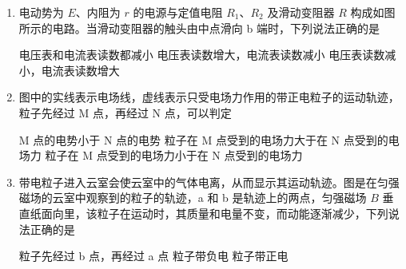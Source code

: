 \documentclass[\gkver]{gaokaozhenti}
\begin{document}
\begin{enumerate}
\item
电动势为 $E$、内阻为 $r$ 的电源与定值电阻 $R_{1}$、$R_{2}$ 及滑动变阻器 $R$ 构成如图所示的电路。当滑动变阻器的触头由中点滑向 b 端时，下列说法正确的是


{电压表和电流表读数都减小}
{电压表读数增大，电流表读数减小}
{电压表读数减小，电流表读数增大}


\item
图中的实线表示电场线，虚线表示只受电场力作用的带正电粒子的运动轨迹，粒子先经过 M 点，再经过 N 点，可以判定


{M 点的电势小于 N 点的电势}
{粒子在 M 点受到的电场力大于在 N 点受到的电场力}
{粒子在 M 点受到的电场力小于在 N 点受到的电场力}


\item
带电粒子进入云室会使云室中的气体电离，从而显示其运动轨迹。图是在匀强磁场的云室中观察到的粒子的轨迹，a 和 b 是轨迹上的两点，匀强磁场 $B$ 垂直纸面向里，该粒子在运动时，其质量和电量不变，而动能逐渐减少，下列说法正确的是


{粒子先经过 b 点，再经过 a 点}
{粒子带负电}
{粒子带正电}


\end{enumerate}
\end{document}
